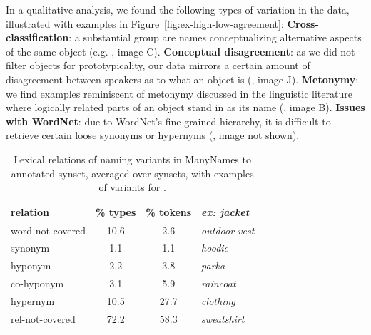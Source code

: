 
In a qualitative analysis, we found the following types of variation in the data, illustrated with examples in Figure~\ref{fig:ex-high-low-agreement}: 
\textbf{Cross-classification}: a substantial group are names conceptualizing alternative aspects of the same object (e.g. , image C).
\textbf{Conceptual disagreement}: as we did not filter objects for prototypicality, our data mirrors a certain amount of disagreement between speakers as to what an object is (, image J).
\textbf{Metonymy}: we find examples reminiscent of metonymy discussed in the linguistic literature \cite{pustejovsky1991generative} where logically related parts of an object stand in as its name (, image B). 
\textbf{Issues with WordNet}: due to WordNet's fine-grained hierarchy, it is difficult to retrieve certain loose synonyms or hypernyms (, image not shown).
%
\begin{table}[t]
\centering
\setlength{\tabcolsep}{2pt}
\begin{tabular}{lcc|p{2.5cm}}
\toprule
         relation & \% types & \% tokens & \it ex: jacket \\
\midrule
 word-not-covered &  10.6 &  2.6 & \it outdoor vest\\
\midrule
 synonym &  1.1 &  1.1 & \it hoodie  \\
 hyponym &  2.2 &  3.8 & \it parka\\ %
 co-hyponym &  3.1 &  5.9 & \it raincoat\\
 hypernym &  10.5 &  27.7 & \it clothing \\%
 rel-not-covered &  72.2 &  58.3 & \it sweatshirt\\%
\bottomrule
\end{tabular}
\caption{Lexical relations of naming variants in ManyNames to annotated \vg synset, averaged over synsets, with examples of variants for .}
\label{tab:rel}
\vspace{-0.5cm}
\end{table}


